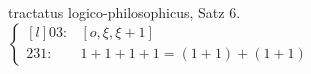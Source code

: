 \documentclass{scrartcl}
\begin{document}
tractatus logico-philosophicus, Satz 6. \(  
\displaystyle
\left\{
	\begin{matrix*}[l]
		03:&  [o,\xi,\xi+1] \\
		231:&  1+1+1+1=(1+1)+(1+1)
	\end{matrix*}
\right.
\)
\end{document}
